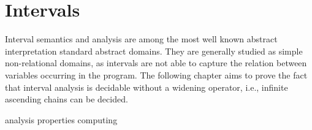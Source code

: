 \chapter{Intervals}

Interval semantics and analysis are among the most well known abstract
interpretation standard abstract domains. They are generally studied
as simple non-relational domains, as intervals are not able to capture
the relation between variables occurring in the program.  The
following chapter aims to prove the fact that interval analysis is
decidable without a widening operator, i.e., infinite ascending chains
can be decided.

{analysis}
{properties}
{computing}
